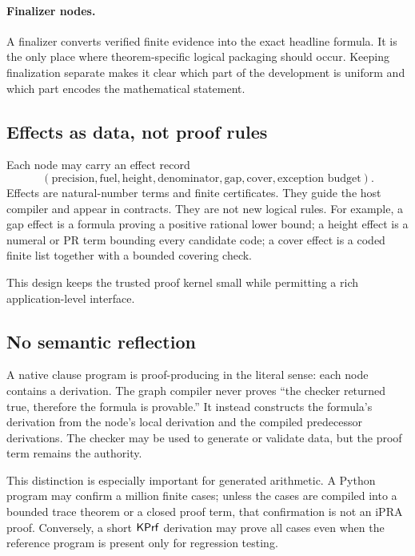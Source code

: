 \paragraph{Finalizer nodes.}
A finalizer converts verified finite evidence into the exact headline formula.
It is the only place where theorem-specific logical packaging should occur.
Keeping finalization separate makes it clear which part of the development is
uniform and which part encodes the mathematical statement.

\subsection{Effects as data, not proof rules}

Each node may carry an effect record
\[
  (\text{precision},\text{fuel},\text{height},\text{denominator},
    \text{gap},\text{cover},\text{exception budget}).
\]
Effects are natural-number terms and finite certificates.  They guide the host
compiler and appear in contracts.  They are not new logical rules.  For
example, a gap effect is a formula proving a positive rational lower bound; a
height effect is a numeral or PR term bounding every candidate code; a cover
effect is a coded finite list together with a bounded covering check.

This design keeps the trusted proof kernel small while permitting a rich
application-level interface.

\subsection{No semantic reflection}

A native clause program is proof-producing in the literal sense: each node
contains a derivation.  The graph compiler never proves
``the checker returned true, therefore the formula is provable.''  It instead
constructs the formula's derivation from the node's local derivation and the
compiled predecessor derivations.  The checker may be used to generate or
validate data, but the proof term remains the authority.

This distinction is especially important for generated arithmetic.  A Python
program may confirm a million finite cases; unless the cases are compiled into
a bounded trace theorem or a closed proof term, that confirmation is not an
iPRA proof.  Conversely, a short \(\mathsf{KPrf}\) derivation may prove all cases even
when the reference program is present only for regression testing.
